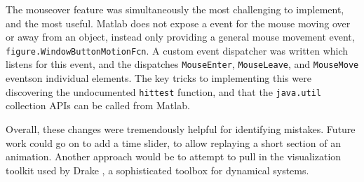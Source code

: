 \documentclass[main.tex]{subfiles}
\begin{document}
The mouseover feature was simultaneously the most challenging to implement, and the most useful.
Matlab does not expose a event for the mouse moving over or away from an object, instead only providing a general mouse movement event, \texttt{figure.WindowButtonMotionFcn}.
A custom event dispatcher was written which listens for this event, and the dispatches \texttt{MouseEnter}, \texttt{MouseLeave}, and \texttt{MouseMove} events\footnotemark on individual elements.
The key tricks to implementing this were discovering the undocumented \texttt{hittest} function\cite{matlab-hittest}, and that the \texttt{java.util} collection APIs can be called from Matlab.


Overall, these changes were tremendously helpful for identifying mistakes.
Future work could go on to add a time slider, to allow replaying a short section of an animation. Another approach would be to attempt to pull in the visualization toolkit used by Drake \cite{drake}, a sophisticated toolbox for dynamical systems.


\bib
\end{document}
